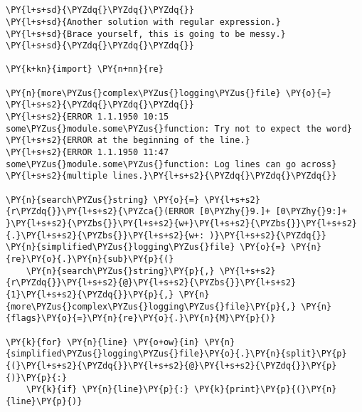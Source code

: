 

\section*{}

\begin{Verbatim}[commandchars=\\\{\}]
\PY{l+s+sd}{\PYZdq{}\PYZdq{}\PYZdq{}}
\PY{l+s+sd}{Another solution with regular expression.}
\PY{l+s+sd}{Brace yourself, this is going to be messy.}
\PY{l+s+sd}{\PYZdq{}\PYZdq{}\PYZdq{}}

\PY{k+kn}{import} \PY{n+nn}{re}

\PY{n}{more\PYZus{}complex\PYZus{}logging\PYZus{}file} \PY{o}{=} \PY{l+s+s2}{\PYZdq{}\PYZdq{}\PYZdq{}}
\PY{l+s+s2}{ERROR 1.1.1950 10:15 some\PYZus{}module.some\PYZus{}function: Try not to expect the word}
\PY{l+s+s2}{ERROR at the beginning of the line.}
\PY{l+s+s2}{ERROR 1.1.1950 11:47 some\PYZus{}module.some\PYZus{}function: Log lines can go across}
\PY{l+s+s2}{multiple lines.}\PY{l+s+s2}{\PYZdq{}\PYZdq{}\PYZdq{}}

\PY{n}{search\PYZus{}string} \PY{o}{=} \PY{l+s+s2}{r\PYZdq{}}\PY{l+s+s2}{\PYZca{}(ERROR [0\PYZhy{}9.]+ [0\PYZhy{}9:]+ }\PY{l+s+s2}{\PYZbs{}}\PY{l+s+s2}{w+}\PY{l+s+s2}{\PYZbs{}}\PY{l+s+s2}{.}\PY{l+s+s2}{\PYZbs{}}\PY{l+s+s2}{w+: )}\PY{l+s+s2}{\PYZdq{}}
\PY{n}{simplified\PYZus{}logging\PYZus{}file} \PY{o}{=} \PY{n}{re}\PY{o}{.}\PY{n}{sub}\PY{p}{(}
    \PY{n}{search\PYZus{}string}\PY{p}{,} \PY{l+s+s2}{r\PYZdq{}}\PY{l+s+s2}{@}\PY{l+s+s2}{\PYZbs{}}\PY{l+s+s2}{1}\PY{l+s+s2}{\PYZdq{}}\PY{p}{,} \PY{n}{more\PYZus{}complex\PYZus{}logging\PYZus{}file}\PY{p}{,} \PY{n}{flags}\PY{o}{=}\PY{n}{re}\PY{o}{.}\PY{n}{M}\PY{p}{)}

\PY{k}{for} \PY{n}{line} \PY{o+ow}{in} \PY{n}{simplified\PYZus{}logging\PYZus{}file}\PY{o}{.}\PY{n}{split}\PY{p}{(}\PY{l+s+s2}{\PYZdq{}}\PY{l+s+s2}{@}\PY{l+s+s2}{\PYZdq{}}\PY{p}{)}\PY{p}{:}
    \PY{k}{if} \PY{n}{line}\PY{p}{:} \PY{k}{print}\PY{p}{(}\PY{n}{line}\PY{p}{)}
\end{Verbatim}


